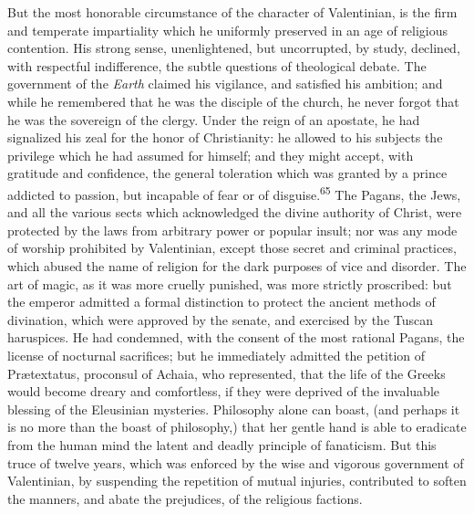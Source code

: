 


But the most honorable circumstance of the character of
Valentinian, is the firm and temperate impartiality which he
uniformly preserved in an age of religious contention. His strong
sense, unenlightened, but uncorrupted, by study, declined, with
respectful indifference, the subtle questions of theological
debate. The government of the \textit{Earth} claimed his vigilance, and
satisfied his ambition; and while he remembered that he was the
disciple of the church, he never forgot that he was the sovereign
of the clergy. Under the reign of an apostate, he had signalized
his zeal for the honor of Christianity: he allowed to his
subjects the privilege which he had assumed for himself; and they
might accept, with gratitude and confidence, the general
toleration which was granted by a prince addicted to passion, but
incapable of fear or of disguise.\textsuperscript{65} The Pagans, the Jews, and
all the various sects which acknowledged the divine authority of
Christ, were protected by the laws from arbitrary power or
popular insult; nor was any mode of worship prohibited by
Valentinian, except those secret and criminal practices, which
abused the name of religion for the dark purposes of vice and
disorder. The art of magic, as it was more cruelly punished, was
more strictly proscribed: but the emperor admitted a formal
distinction to protect the ancient methods of divination, which
were approved by the senate, and exercised by the Tuscan
haruspices. He had condemned, with the consent of the most
rational Pagans, the license of nocturnal sacrifices; but he
immediately admitted the petition of Prætextatus, proconsul of
Achaia, who represented, that the life of the Greeks would become
dreary and comfortless, if they were deprived of the invaluable
blessing of the Eleusinian mysteries. Philosophy alone can boast,
(and perhaps it is no more than the boast of philosophy,) that
her gentle hand is able to eradicate from the human mind the
latent and deadly principle of fanaticism. But this truce of
twelve years, which was enforced by the wise and vigorous
government of Valentinian, by suspending the repetition of mutual
injuries, contributed to soften the manners, and abate the
prejudices, of the religious factions.

